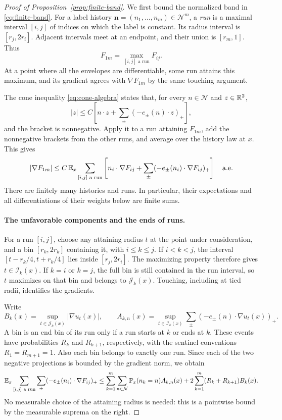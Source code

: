 \begin{proof}[Proof of Proposition~\ref{prop:finite-band}]
We first bound the normalized band in \eqref{eq:finite-band}.
For a label history $\mathbf n=(n_1,\ldots,n_m)\in\mathcal N^m$,
a \emph{run} is a maximal interval $[i,j]$ of indices on which
the label is constant. Its radius interval is $[r_j,2r_i]$.
Adjacent intervals meet at an endpoint, and their union is
$[r_m,1]$. Thus
\[
 F_{1m}=\max_{[i,j]\text{ a run}}F_{ij}.
\]
At a point where all the envelopes are differentiable, some run
attains this maximum, and its gradient agrees with $\nabla F_{1m}$
by the same touching argument.

The cone inequality \eqref{eq:cone-algebra} states that, for every
$n\in\mathcal N$ and $z\in\mathbb R^2$,
\[
 |z|\le C\left[n\cdot z+
                 \sum_{\pm}(-e_\pm(n)\cdot z)_+\right],
\]
and the bracket is nonnegative. Apply it to a run attaining
$F_{1m}$, add the nonnegative brackets from the other runs, and
average over the history law at $x$. This gives
\begin{equation}\label{eq:run-master}
 |\nabla F_{1m}|
 \le C\,\mathbb E_x\sum_{[i,j]\text{ a run}}
 \left[n_i\cdot\nabla F_{ij}
       +\sum_{\pm}(-e_\pm(n_i)\cdot\nabla F_{ij})_+\right]
 \quad\text{a.e.}
\end{equation}
There are finitely many histories and runs. In particular, their
expectations and all differentiations of their weights below are
finite sums.

\paragraph{The unfavorable components and the ends of runs.}
For a run $[i,j]$, choose any attaining radius $t$ at the point
under consideration, and a bin $[r_k,2r_k]$ containing it, with
$i\le k\le j$. If $i<k<j$, the interval
$[t-r_k/4,t+r_k/4]$ lies inside $[r_j,2r_i]$. The maximizing
property therefore gives $t\in\mathcal I_k(x)$. If $k=i$ or
$k=j$, the full bin is still contained in the run interval, so
$t$ maximizes on that bin and belongs to $\mathcal J_k(x)$.
Touching, including at tied radii, identifies the gradients.

Write
\[
 B_k(x)=\sup_{t\in\mathcal J_k(x)}|\nabla u_t(x)|,
 \qquad
 A_{k,n}(x)=\sup_{t\in\mathcal I_k(x)}
                  \sum_{\pm}(-e_\pm(n)\cdot\nabla u_t(x))_+.
\]
A bin is an end bin of its run only if a run starts at $k$ or
ends at $k$. These events have probabilities $R_k$ and $R_{k+1}$,
respectively, with the sentinel conventions $R_1=R_{m+1}=1$.
Also each bin belongs to exactly one run. Since each of the two
negative projections is bounded by the gradient norm, we obtain
\begin{equation}\label{eq:negative-sum}
 \mathbb E_x\sum_{[i,j]\text{ a run}}\sum_\pm
       (-e_\pm(n_i)\cdot\nabla F_{ij})_+
 \le\sum_{k=1}^m\sum_{n\in\mathcal N}
          \mathbb P_x(n_k=n)A_{k,n}(x)
       +2\sum_{k=1}^m(R_k+R_{k+1})B_k(x).
\end{equation}
No measurable choice of the attaining radius is needed: this is
a pointwise bound by the measurable suprema on the right.


\end{proof}
